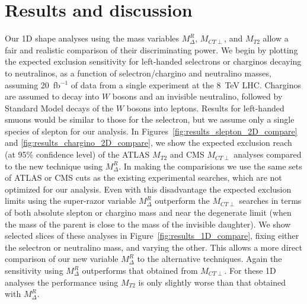 \clearpage

\section{Results and discussion \label{sec:conclusion}}

Our 1D shape analyses using the mass variables $M_\Delta^R$, $M_{CT\perp}$, and $M_{T2}$ allow
a fair and realistic comparison of their discriminating power.
We begin by plotting the expected exclusion sensitivity for left-handed selectrons or charginos decaying to neutralinos, as a function of selectron/chargino and neutralino masses, assuming 20~fb$^{-1}$ of data from a single experiment at the 8~TeV LHC. Charginos are assumed to decay into $W$ bosons and an invisible neutralino, followed by Standard Model decays of the $W$ bosons into leptons. Results for left-handed smuons would be similar to those for the selectron, but we assume only a single species of slepton for our analysis. In Figures~\ref{fig:results_slepton_2D_compare} and \ref{fig:results_chargino_2D_compare}, we show the expected exclusion reach (at 95\% confidence level) of the ATLAS $M_{T2}$ and CMS $M_{CT\perp}$ analyses compared to the new technique using $M_\Delta^R$. In making the comparisions we use the same sets of ATLAS or CMS cuts as the existing experimental searches, which are not optimized for our analysis. 
Even with this disadvantage the expected exclusion limits using the super-razor variable $M_\Delta^R$ outperform the $M_{CT\perp}$ searches in terms of both absolute slepton or chargino mass and near the degenerate limit (when the mass of the parent is close to the mass of the invisible daughter). We show selected slices of these analyses in Figure~\ref{fig:results_1D_compare}, fixing either the selectron or neutralino mass, and varying the other. This allows a more direct comparison of our new variable $M_\Delta^R$ to the alternative techniques. Again the sensitivity using $M_\Delta^R$ outperforms
that obtained from $M_{CT\perp}$. For these 1D analyses the performance using $M_{T2}$ is only
slightly worse than that obtained with $M_\Delta^R$.

